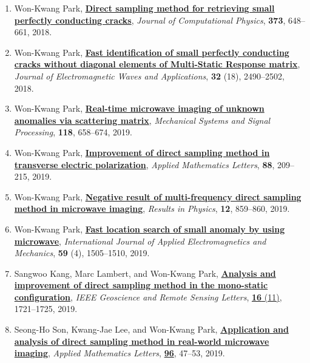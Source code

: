 \documentclass[10pt,A4]{article}
\begin{document}
\begin{enumerate}
\item\label{A-JCOMP2018} Won-Kwang Park, \href{https://doi.org/10.1016/j.jcp.2018.07.014}{\textbf{Direct sampling method for retrieving small perfectly conducting cracks}}, \textit{Journal of Computational Physics}, \textbf{373}, 648--661, 2018.
\item\label{A-JEMWA2018} Won-Kwang Park, \href{https://doi.org/10.1080/09205071.2018.1518162}{\textbf{Fast identification of small perfectly conducting cracks without diagonal elements of Multi-Static Response matrix}}, \textit{Journal of Electromagnetic Waves and Applications}, \textbf{32} (18), 2490--2502, 2018.
\item\label{A-MSSP2019} Won-Kwang Park, \href{https://doi.org/10.1016/j.ymssp.2018.09.012}{\textbf{Real-time microwave imaging of unknown anomalies via scattering matrix}}, \textit{Mechanical Systems and Signal Processing}, \textbf{118}, 658--674, 2019.
\item\label{A-AML2019A} Won-Kwang Park, \href{https://doi.org/10.1016/j.aml.2018.09.001}{\textbf{Improvement of direct sampling method in transverse electric polarization}}, \textit{Applied Mathematics Letters}, \textbf{88}, 209--215, 2019.
\item\label{A-RINP2019} Won-Kwang Park, \href{https://doi.org/10.1016/j.rinp.2018.11.015}{\textbf{Negative result of multi-frequency direct sampling method in microwave imaging}}, \textit{Results in Physics}, \textbf{12}, 859--860, 2019.
\item\label{A-IJAEM2019} Won-Kwang Park, \href{https://doi.org/10.3233/JAE-171107}{\textbf{Fast location search of small anomaly by using microwave}}, \textit{International Journal of Applied Electromagnetics and Mechanics}, \textbf{59} (4), 1505--1510, 2019.
\item\label{A-GRSL2019} Sangwoo Kang, Marc Lambert, and Won-Kwang Park, \href{https://doi.org/10.1109/LGRS.2019.2906366}{\textbf{Analysis and improvement of direct sampling method in the mono-static configuration}}, \textit{IEEE Geoscience and Remote Sensing Letters}, \href{https://ieeexplore.ieee.org/xpl/tocresult.jsp?isnumber=8887580&punumber=8859}{\textbf{16} (11)}, 1721--1725, 2019.
\item\label{A-AML2019B} Seong-Ho Son, Kwang-Jae Lee, and Won-Kwang Park, \href{https://doi.org/10.1016/j.aml.2019.04.016}{\textbf{Application and analysis of direct sampling method in real-world microwave imaging}}, \textit{Applied Mathematics Letters}, \href{https://www.sciencedirect.com/science/journal/08939659/96/supp/C}{\textbf{96}}, 47--53, 2019.

\end{enumerate}
\end{document}
